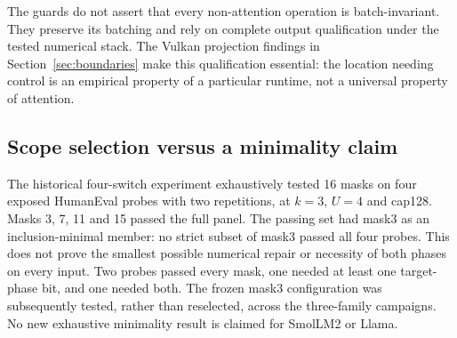 The guards do not assert that every non-attention operation is batch-invariant. They preserve its batching and rely on complete output qualification under the tested numerical stack. The Vulkan projection findings in Section~\ref{sec:boundaries} make this qualification essential: the location needing control is an empirical property of a particular runtime, not a universal property of attention.

\subsection{Scope selection versus a minimality claim}
The historical four-switch experiment exhaustively tested 16 masks on four exposed HumanEval probes with two repetitions, at $k=3$, $U=4$ and cap128. Masks 3, 7, 11 and 15 passed the full panel. The passing set had mask3 as an inclusion-minimal member: no strict subset of mask3 passed all four probes. This does not prove the smallest possible numerical repair or necessity of both phases on every input. Two probes passed every mask, one needed at least one target-phase bit, and one needed both. The frozen mask3 configuration was subsequently tested, rather than reselected, across the three-family campaigns. No new exhaustive minimality result is claimed for SmolLM2 or Llama.
